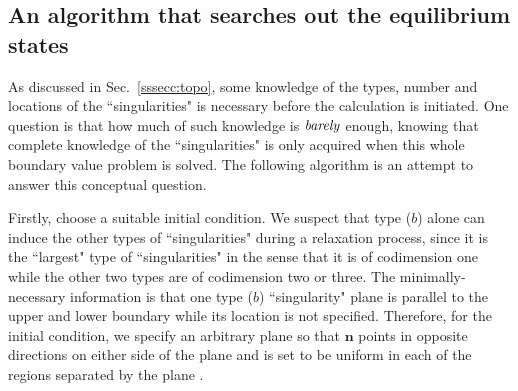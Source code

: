 \documentclass[nottitlepage]{article}
\makeatletter
\providecommand\hyperref[2][]{#2}
\newcommand{\mt@ref}[1]{%
\cref@gettype{#1}{\@temptype}%
\cref@getcounter{#1}{\@tempctr}%
\def\mtt{\the\csname c@\@temptype\endcsname}%
\ifnum\mtt=\numexpr\@tempctr-1\relax \mtcase the next \hyperref[#1]{\@temptype}\else%
\ifnum\mtt=\numexpr\@tempctr+1\relax \mtcase the previous \hyperref[#1]{\@temptype}\else%
\cref{#1}\fi\fi}
\newcommand{\mtref}{\let\mtcase\relax\mt@ref}
\makeatother
\begin{document}
       

 
  
  \subsection{An algorithm that searches out the equilibrium states}\label{sec:A}






As discussed in Sec.~\ref{sssecc:topo}, some knowledge of the types, number and locations of the ``singularities" is necessary before the calculation is initiated. One question is that how much of such knowledge is $\it{barely}$ enough, knowing that complete knowledge of the ``singularities" is only acquired when this whole boundary value problem is solved. %
The following algorithm is an attempt to answer this conceptual question.


Firstly, choose a suitable initial condition. We suspect that type ($b$) alone can induce the other types of ``singularities" during a relaxation process, since it is the ``largest" type of ``singularities" in the sense that it is of codimension one while the other two types are of codimension two or three. The minimally-necessary information is that one type ($b$) ``singularity" plane is parallel to the upper and lower boundary while its location is not specified. Therefore, for the initial condition, we specify an arbitrary plane so that $\mathbf{n}$ points in opposite directions on either side of the plane and is set to be uniform in each of the regions separated by the plane .
 
\end{document}
